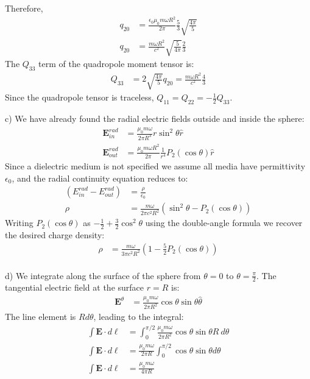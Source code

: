 \documentclass[a4paper,11pt]{article}
\numberwithin{equation}{section}
\newcommand{\bv}[1]{\mathbf{#1}}
\newcommand{\ez}{\epsilon_0}
\newcommand{\lrp}[1]{\left({#1}\right)}
\begin{document}
Therefore,
\begin{align}
 q_{20} &= \frac{\ez\mu_0 m \omega R^2}{2\pi}\frac{5}{3}\sqrt{\frac{4\pi}{5}}\\
 q_{20} &= \frac{m \omega R^2}{c^2}\sqrt{\frac{5}{4\pi}}\frac{2}{3}
\end{align}
The $Q_{33}$ term of the quadropole moment tensor is:
\begin{align}
 Q_{33} &= 2\sqrt{\frac{4\pi}{5}}q_{20} = \frac{m \omega R^2}{c^2}\frac{4}{3}
\end{align}
Since the quadropole tensor is traceless, $Q_{11}=Q_{22}=-\frac{1}{2}Q_{33}$.

c) We have already found the radial electric fields outside and inside the sphere:
\begin{align}
 \bv{E}^{rad}_{in} &= \frac{\mu_0 m \omega}{2\pi R^3}r\sin^2{\theta}\hat{r}\\
 \bv{E}^{rad}_{out} &= \frac{\mu_0 m \omega R^2}{2\pi} \frac{1}{r^4}P_2(\cos{\theta})\hat{r}
\end{align}
Since a dielectric medium is not specified we assume all media have permittivity $\ez$, and the radial continuity equation reduces to:
\begin{align}
 (E^{rad}_{in}-E^{rad}_{out}) &= \frac{\rho}{\ez}\\
 \rho &= \frac{m\omega}{2\pi c^2R^2}\lrp{\sin^2{\theta}-P_2(\cos{\theta})}
\end{align}
Writing $P_2(\cos{\theta})$ as $-\frac{1}{2}+\frac{3}{2}\cos^2{\theta}$ using the double-angle formula we recover the desired charge density:
\begin{align}
 \rho &= \frac{m\omega}{3\pi c^2R^2}\lrp{1-\frac{5}{2}P_2(\cos{\theta})}
\end{align}
\\
d) We integrate along the surface of the sphere from $\theta=0$ to $\theta=\frac{\pi}{2}$.
The tangential electric field at the surface $r=R$ is:
\begin{align}
 \bv{E}^{\theta} &= \frac{\mu_0 m \omega}{2\pi R^2}\cos{\theta}\sin{\theta}\hat{\theta}
\end{align}
The line element is $Rd\theta$, leading to the integral:
\begin{align}
 \int \bv{E} \cdot d\ell &= \int_0^{\pi/2}\frac{\mu_0 m \omega}{2\pi R^2}\cos{\theta}\sin{\theta} R\ d\theta\\
 \int \bv{E} \cdot d\ell &= \frac{\mu_0 m \omega}{2\pi R}\int_0^{\pi/2}\cos{\theta}\sin{\theta} d\theta\\
 \int \bv{E} \cdot d\ell &= \frac{\mu_0 m \omega}{4\pi R}
\end{align}
\end{document}
